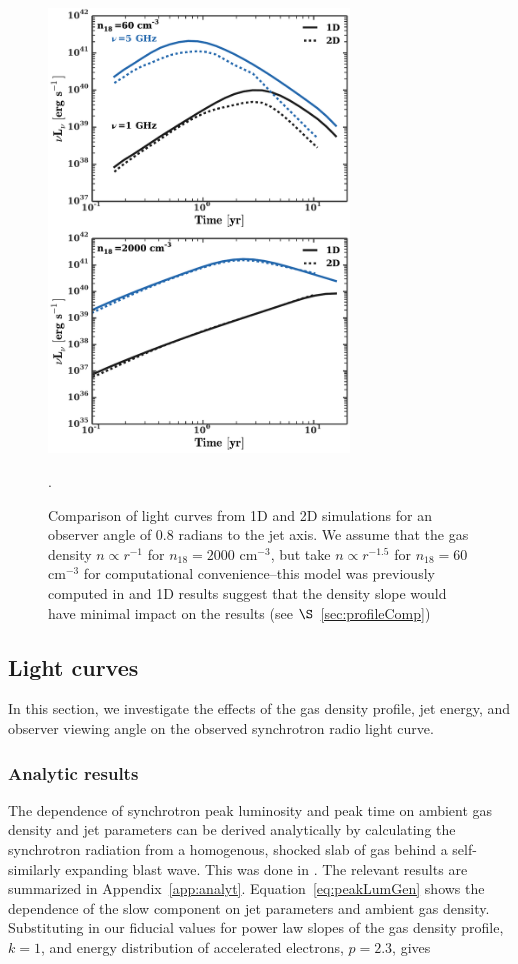 \documentclass[usenatbib,fleqn]{mnras}
\begin{document}
\begin{figure}
\includegraphics[width=8cm]{1d_2d.pdf}
\caption{\label{fig:1D2DB} Comparison of light curves from 1D and 2D
  simulations for an observer angle of 0.8 radians to the jet
  axis. We assume that the gas density $n\propto r^{-1}$ for
  $n_{18}=2000$ cm$^{-3}$, but take $n\propto r^{-1.5}$ for
  $n_{18}=60$ cm$^{-3}$ for computational convenience--this model was
  previously computed in \citet{Mimica+2015} and 1D results suggest
  that the density slope would have minimal impact on the results (see
  $\S$~\ref{sec:profileComp})}.
\end{figure}

\subsection{Light curves}
\label{sec:lightcurves}
In this section, we investigate the effects of the gas density
profile, jet energy, and observer viewing angle on the observed
synchrotron radio light curve. 

\subsubsection{Analytic results}
The dependence of synchrotron peak luminosity and peak time on ambient
gas density and jet parameters can be derived analytically by
calculating the synchrotron radiation from a homogenous, shocked slab
of gas behind a self-similarly expanding blast wave. This was done in
\citet{Leventis+2012}. The relevant results are summarized in
Appendix~\ref{app:analyt}. Equation~\ref{eq:peakLumGen} shows the
dependence of the slow component on jet parameters and ambient gas
density. Substituting in our fiducial values for power law slopes of
the gas density profile, $k=1$, and energy distribution of accelerated
electrons, $p=2.3$, gives
\end{document}

